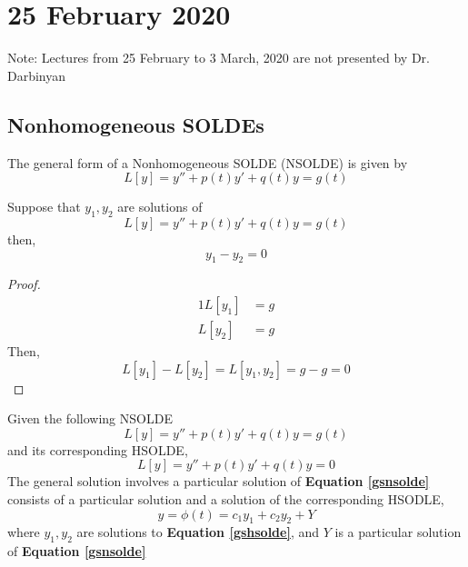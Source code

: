\documentclass[diffeq.tex]{subfiles}
\begin{document}
\chapter{25 February 2020}
    Note: Lectures from 25 February to 3 March, 2020 are not presented by Dr. Darbinyan
    \section{Nonhomogeneous SOLDEs}
    \begin{definition}
        The general form of a Nonhomogeneous SOLDE (NSOLDE) is given by
        \begin{equation}
            L[y] = y'' + p(t)y' + q(t)y = g(t)
        \end{equation}
    \end{definition}
    \begin{theorem}
        Suppose that $y_{1}, y_{2}$ are solutions of
        \begin{equation}
            L[y] = y'' + p(t)y' + q(t)y = g(t)
        \end{equation}
        then,
        \begin{equation}
            y_{1} - y_{2} = 0
        \end{equation}
    \end{theorem}
    \begin{proof}
        \begin{alignat}{1}
            L[y_{1}] & = g\\
            L[y_{2}] & = g
        \end{alignat}
        Then,
        \begin{equation}
            L[y_{1}] - L[y_{2}] = L[y_{1}, y_{2}] = g - g = 0
        \end{equation}
    \end{proof}
    \begin{theorem}
        Given the following NSOLDE
        \begin{equation}
            \label{gsnsolde}
            L[y] = y'' + p(t)y' + q(t)y = g(t)
        \end{equation}
        and its corresponding HSOLDE,
        \begin{equation}
            \label{gshsolde}
            L[y] = y'' + p(t)y' + q(t)y = 0
        \end{equation}
        The general solution involves a particular solution of \textbf{Equation \ref{gsnsolde}} consists of a particular solution and a solution of the corresponding HSODLE,
        \begin{equation}
            \label{gs}
            y = \phi(t) = c_{1}y_{1} + c_{2}y_{2} + Y
        \end{equation}
        where $y_{1}, y_{2}$ are solutions to \textbf{Equation \ref{gshsolde}}, and $Y$ is a particular solution of \textbf{Equation \ref{gsnsolde}}
    \end{theorem}
\end{document}
